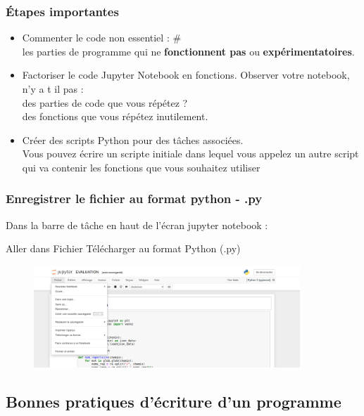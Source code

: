 \begin{frame}
 \frametitle{Étapes importantes}
\begin{itemize}
\item \textcolor{green}{} Commenter le code non essentiel : \# \\
 les parties de programme qui ne \textbf{fonctionnent pas} ou \textbf{expérimentatoires}.

\pause

\item \textcolor{green}{} Factoriser le code Jupyter Notebook en fonctions. Observer votre notebook, n'y a t il pas :\\
 des parties de code que vous répétez ?\\
 des fonctions que vous répétez inutilement.

\pause

\item \textcolor{green}{} Créer des scripts Python pour des tâches associées.\\
 Vous pouvez écrire un scripte initiale dans lequel vous appelez un autre script qui va contenir les fonctions que vous souhaitez utiliser
\end{itemize} 
\end{frame}


\begin{frame}
  \frametitle{Enregistrer le fichier au format python - .py}
  Dans la barre de tâche en haut de l'écran jupyter notebook :
  
  
  Aller dans Fichier   Télécharger au format   Python (.py)
  
  \begin{figure}
  \includegraphics[width=10cm]{images/ynpb_convert_py.png}
  \end{figure}
 
\end{frame}


\subsection{Bonnes pratiques d'écriture d'un programme}

